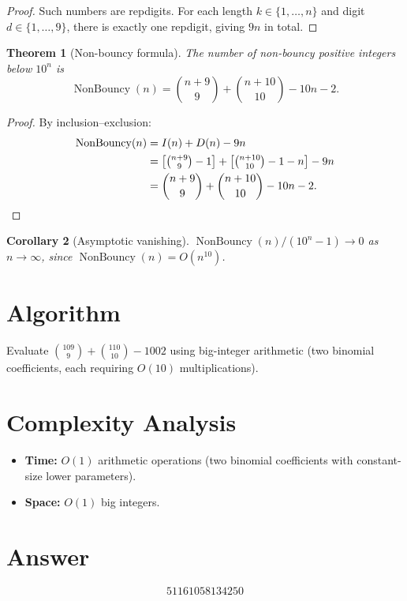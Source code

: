 \documentclass[12pt]{article}
\newtheorem{theorem}{Theorem}
\newtheorem{corollary}[theorem]{Corollary}
\begin{document}
\begin{proof}
Such numbers are repdigits. For each length $k \in \{1,\ldots,n\}$ and digit $d \in \{1,\ldots,9\}$, there is exactly one repdigit, giving $9n$ in total.
\end{proof}

\begin{theorem}[Non-bouncy formula]
The number of non-bouncy positive integers below $10^n$ is
\[
\operatorname{NonBouncy}(n) = \binom{n+9}{9} + \binom{n+10}{10} - 10n - 2.
\]
\end{theorem}

\begin{proof}
By inclusion--exclusion:
\begin{align*}
\operatorname{NonBouncy}(n) &= I(n) + D(n) - 9n \\
&= \bigl[\tbinom{n+9}{9} - 1\bigr] + \bigl[\tbinom{n+10}{10} - 1 - n\bigr] - 9n \\
&= \binom{n+9}{9} + \binom{n+10}{10} - 10n - 2. \qedhere
\end{align*}
\end{proof}

\begin{corollary}[Asymptotic vanishing]
$\operatorname{NonBouncy}(n)/(10^n - 1) \to 0$ as $n \to \infty$, since $\operatorname{NonBouncy}(n) = O(n^{10})$.
\end{corollary}

\section{Algorithm}

Evaluate $\binom{109}{9} + \binom{110}{10} - 1002$ using big-integer arithmetic (two binomial coefficients, each requiring $O(10)$ multiplications).

\section{Complexity Analysis}

\begin{itemize}
\item \textbf{Time:} $O(1)$ arithmetic operations (two binomial coefficients with constant-size lower parameters).
\item \textbf{Space:} $O(1)$ big integers.
\end{itemize}

\section{Answer}

\[
\boxed{51161058134250}
\]
\end{document}
